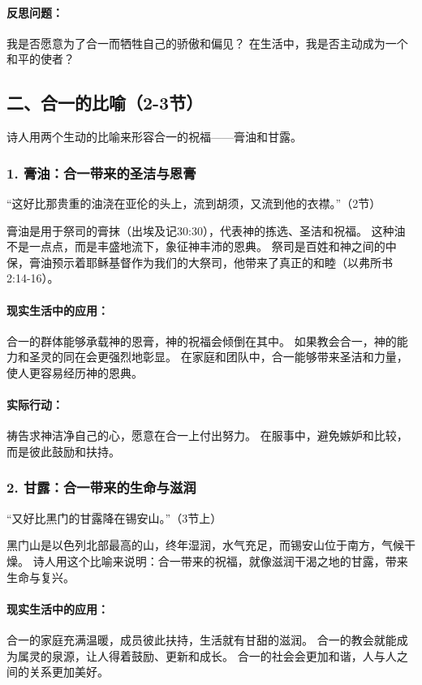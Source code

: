 \documentclass[a4paper, 12pt]{article}
\begin{document}
\paragraph*{反思问题：}

我是否愿意为了合一而牺牲自己的骄傲和偏见？
在生活中，我是否主动成为一个和平的使者？
\subsection*{二、合一的比喻（2-3节）}
诗人用两个生动的比喻来形容合一的祝福——膏油和甘露。

\subsubsection*{1. 膏油：合一带来的圣洁与恩膏}
“这好比那贵重的油浇在亚伦的头上，流到胡须，又流到他的衣襟。”（2节）

膏油是用于祭司的膏抹（出埃及记30:30），代表神的拣选、圣洁和祝福。
这种油不是一点点，而是丰盛地流下，象征神丰沛的恩典。
祭司是百姓和神之间的中保，膏油预示着耶稣基督作为我们的大祭司，他带来了真正的和睦（以弗所书2:14-16）。
\paragraph*{现实生活中的应用：}

合一的群体能够承载神的恩膏，神的祝福会倾倒在其中。
如果教会合一，神的能力和圣灵的同在会更强烈地彰显。
在家庭和团队中，合一能够带来圣洁和力量，使人更容易经历神的恩典。
\paragraph*{实际行动：}

祷告求神洁净自己的心，愿意在合一上付出努力。
在服事中，避免嫉妒和比较，而是彼此鼓励和扶持。
\subsubsection*{2. 甘露：合一带来的生命与滋润}
“又好比黑门的甘露降在锡安山。”（3节上）

黑门山是以色列北部最高的山，终年湿润，水气充足，而锡安山位于南方，气候干燥。
诗人用这个比喻来说明：合一带来的祝福，就像滋润干渴之地的甘露，带来生命与复兴。
\paragraph*{现实生活中的应用：}

合一的家庭充满温暖，成员彼此扶持，生活就有甘甜的滋润。
合一的教会就能成为属灵的泉源，让人得着鼓励、更新和成长。
合一的社会会更加和谐，人与人之间的关系更加美好。
\end{document}
